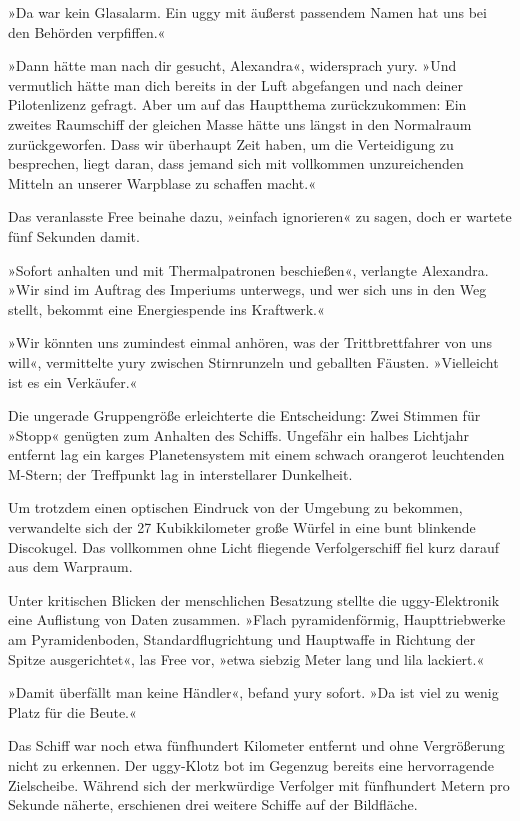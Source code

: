 »Da war kein Glasalarm. Ein uggy mit äußerst passendem Namen hat uns bei den Behörden verpfiffen.«

»Dann hätte man nach dir gesucht, Alexandra«, widersprach yury. »Und vermutlich hätte man dich bereits in der Luft abgefangen und nach deiner Pilotenlizenz gefragt. Aber um auf das Hauptthema zurückzukommen: Ein zweites Raumschiff der gleichen Masse hätte uns längst in den Normalraum zurückgeworfen. Dass wir überhaupt Zeit haben, um die Verteidigung zu besprechen, liegt daran, dass jemand sich mit vollkommen unzureichenden Mitteln an unserer Warpblase zu schaffen macht.«

Das veranlasste Free beinahe dazu, »einfach ignorieren« zu sagen, doch er wartete fünf Sekunden damit.

»Sofort anhalten und mit Thermalpatronen beschießen«, verlangte Alexandra. »Wir sind im Auftrag des Imperiums unterwegs, und wer sich uns in den Weg stellt, bekommt eine Energiespende ins Kraftwerk.«

»Wir könnten uns zumindest einmal anhören, was der Trittbrettfahrer von uns will«, vermittelte yury zwischen Stirnrunzeln und geballten Fäusten. »Vielleicht ist es ein Verkäufer.«

Die ungerade Gruppengröße erleichterte die Entscheidung: Zwei Stimmen für »Stopp« genügten zum Anhalten des Schiffs. Ungefähr ein halbes Lichtjahr entfernt lag ein karges Planetensystem mit einem schwach orangerot leuchtenden M-Stern; der Treffpunkt lag in interstellarer Dunkelheit.

Um trotzdem einen optischen Eindruck von der Umgebung zu bekommen, verwandelte sich der 27 Kubikkilometer große Würfel in eine bunt blinkende Discokugel. Das vollkommen ohne Licht fliegende Verfolgerschiff fiel kurz darauf aus dem Warpraum.

Unter kritischen Blicken der menschlichen Besatzung stellte die uggy-Elektronik eine Auflistung von Daten zusammen. »Flach pyramidenförmig, Haupttriebwerke am Pyramidenboden, Standardflugrichtung und Hauptwaffe in Richtung der Spitze ausgerichtet«, las Free vor, »etwa siebzig Meter lang und lila lackiert.«

»Damit überfällt man keine Händler«, befand yury sofort. »Da ist viel zu wenig Platz für die Beute.«

Das Schiff war noch etwa fünfhundert Kilometer entfernt und ohne Vergrößerung nicht zu erkennen. Der uggy-Klotz bot im Gegenzug bereits eine hervorragende Zielscheibe. Während sich der merkwürdige Verfolger mit fünfhundert Metern pro Sekunde näherte, erschienen drei weitere Schiffe auf der Bildfläche.

